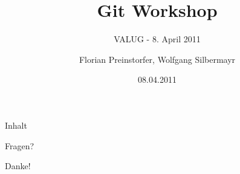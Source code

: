 \documentclass[%
]{beamer}
\title{Git Workshop}
\subtitle{VALUG - 8. April 2011}
\author[Florian Preinstorfer, Wolfgang Silbermayr]{Florian Preinstorfer, Wolfgang Silbermayr}
\date[valug - 08.04.2011]{08.04.2011}
\begin{document}
\frame[plain]{\titlepage}

\begin{frame}{Inhalt}
  \tableofcontents[pausesections]
\end{frame}


\begin{frame}[plain]
  \begin{center}
  Fragen?

  Danke!
  \end{center}
\end{frame}
\end{document}
